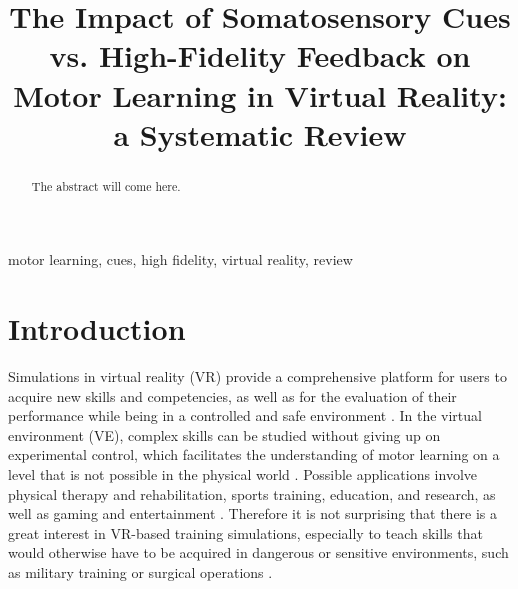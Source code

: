 \documentclass[conference]{IEEEtran}
\begin{document}
\title{The Impact of Somatosensory Cues vs. High-Fidelity Feedback on Motor Learning in Virtual Reality: a Systematic Review\\}

\author{
\and
{}
\and
{}
}

\maketitle

\begin{abstract}
The abstract will come here. \\

\end{abstract}

\begin{IEEEkeywords}
motor learning, cues, high fidelity, virtual reality, review
\end{IEEEkeywords}

\section{Introduction}
Simulations in virtual reality (VR) provide a comprehensive platform for users to acquire new skills and competencies, as well as for the evaluation of their performance while being in a controlled and safe environment \cite{Harris2021ExploringSimulator}. In the virtual environment (VE), complex skills can be studied without giving up on experimental control, which facilitates the understanding of motor learning on a level that is not possible in the physical world \cite{Levac2019LearningReview}. 
Possible applications involve physical therapy and rehabilitation, sports training, education, and research, as well as gaming and entertainment \cite{Wu2023TrainingReality, Oagaz2022PerformanceReality}. Therefore it is not surprising that there is a great interest in VR-based training simulations, especially to teach skills that would otherwise have to be acquired in dangerous or sensitive environments, such as military training or surgical operations \cite{Lele2013VirtualUtility, Qi2021VirtualScenario}.
\end{document}
